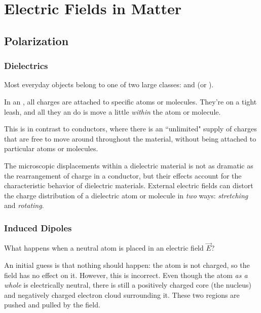 \chapter{Electric Fields in Matter}

\section{Polarization}\label{polarization}

\subsection{Dielectrics}

Most everyday objects belong to one of two large classes:  and  (or ).

\begin{definition}
In an , all charges are attached to specific atoms or molecules. They're on a tight leash, and all they an do is move a little \textit{within} the atom or molecule.
\end{definition}

This is in contrast to conductors, where there is an ``unlimited" supply of charges that are free to move around throughout the material, without being attached to particular atoms or molecules.

The microscopic displacements within a dielectric material is not as dramatic as the rearrangement of charge in a conductor, but their effects account for the characteristic behavior of dielectric materials. External electric fields can distort the charge distribution of a dielectric atom or molecule in \textit{two} ways: \textit{stretching} and \textit{rotating}.

\subsection{Induced Dipoles}\label{induceddipoles}

What happens when a neutral atom is placed in an electric field $\vec{E}$? 

An initial guess is that nothing should happen: the atom is not charged, so the field has no effect on it. However, this is incorrect. Even though the atom \textit{as a whole} is electrically neutral, there is still a positively charged core (the nucleus) and negatively charged electron cloud surrounding it. These two regions are pushed and pulled by the field.

